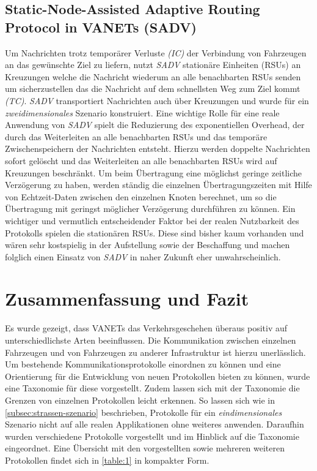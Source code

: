 \documentclass[english,runningheads,a4paper]{llncs}[2018/03/10]
\begin{document}
\subsection{Static-Node-Assisted Adaptive Routing Protocol in VANETs (SADV)}
Um Nachrichten trotz temporärer Verluste \textit{(IC)} der Verbindung von Fahrzeugen an das gewünschte Ziel zu liefern, nutzt \textit{SADV} stationäre Einheiten (RSUs) an Kreuzungen welche die Nachricht wiederum an alle benachbarten RSUs senden um sicherzustellen das die Nachricht auf dem schnellsten Weg zum Ziel kommt \textit{(TC)}.
\textit{SADV} transportiert Nachrichten auch über Kreuzungen und wurde für ein \textit{zweidimensionales} Szenario konstruiert.
Eine wichtige Rolle für eine reale Anwendung von \textit{SADV} spielt die Reduzierung des exponentiellen Overhead, der durch das Weiterleiten an alle benachbarten RSUs und das temporäre Zwischenspeichern der Nachrichten entsteht.
Hierzu werden doppelte Nachrichten sofort gelöscht und das Weiterleiten an alle benachbarten RSUs wird auf Kreuzungen beschränkt.
Um beim Übertragung eine möglichst geringe zeitliche Verzögerung zu haben, werden ständig die einzelnen Übertragungszeiten mit Hilfe von Echtzeit-Daten zwischen den einzelnen Knoten berechnet, um so die Übertragung mit geringst möglicher Verzögerung durchführen zu können.
Ein wichtiger und vermutlich entscheidender Faktor bei der realen Nutzbarkeit des Protokolls spielen die stationären RSUs\cite{conti2013mobile}.
Diese sind bisher kaum vorhanden und wären sehr kostspielig in der Aufstellung sowie der Beschaffung und machen folglich einen Einsatz von \textit{SADV} in naher Zukunft eher unwahrscheinlich.

\section{Zusammenfassung und Fazit}
\label{sec:conclusion}
Es wurde gezeigt, dass VANETs das Verkehrsgeschehen überaus positiv auf unterschiedlichste Arten beeinflussen.
Die Kommunikation zwischen einzelnen Fahrzeugen und von Fahrzeugen zu anderer Infrastruktur ist hierzu unerlässlich.
Um bestehende Kommunikationsprotokolle einordnen zu können und eine Orientierung für die Entwicklung von neuen Protokollen bieten zu können, wurde eine Taxonomie für diese vorgestellt.
Zudem lassen sich mit der Taxonomie die Grenzen von einzelnen Protokollen leicht erkennen.
So lassen sich wie in \ref{subsec:strassen-szenario} beschrieben, Protokolle für ein \textit{eindimensionales} Szenario nicht auf alle realen Applikationen ohne weiteres anwenden.
Daraufhin wurden verschiedene Protokolle vorgestellt und im Hinblick auf die Taxonomie eingeordnet.
Eine Übersicht mit den vorgestellten sowie mehreren weiteren Protokollen findet sich in \ref{table:1} in kompakter Form\cite{conti2013mobile}.
\end{document}
